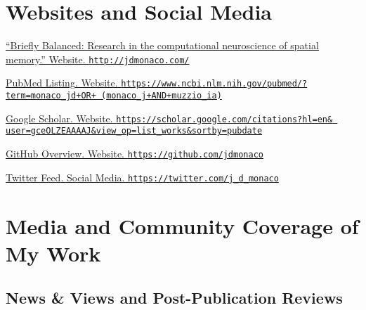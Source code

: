 \documentclass[10pt]{article}
\newcommand{\itemtitle}[1]{{\color{hopkinsblue}\ul{#1}}}
\newcommand{\aurl}[1]{{\color{dimgray}\texttt{#1}}}
\begin{document}
\section*{Websites and Social Media}

\begin{description}
  \item \href{http://jdmonaco.com/}
    {``\itemtitle{Briefly Balanced: Research in the computational neuroscience
of spatial memory}.” Website. \aurl{http://jdmonaco.com/}}
  \item \href{https://www.ncbi.nlm.nih.gov/pubmed/?term=monaco_jd+OR+(monaco_j+AND+muzzio_ia)}
    {\itemtitle{PubMed Listing}. Website. \aurl{https://www.ncbi.nlm.nih.gov/pubmed/?term=monaco\_jd+OR+ (monaco\_j+AND+muzzio\_ia)}}
  \item \href{http://jdmonaco.com/google-scholar}
    {\itemtitle{Google Scholar}. Website. \aurl{https://scholar.google.com/citations?hl=en\& user=gceOLZEAAAAJ\&view\_op=list\_works\&sortby=pubdate}}
  \item \href{https://github.com/jdmonaco}
    {\itemtitle{GitHub Overview}. Website. \aurl{https://github.com/jdmonaco}}
  \item \href{https://twitter.com/j_d_monaco}
    {\itemtitle{Twitter Feed}. Social Media. \aurl{https://twitter.com/j\_d\_monaco}}
\end{description}

\section*{Media and Community Coverage of My Work}

\subsection*{News \& Views and Post-Publication Reviews}
\end{document}
